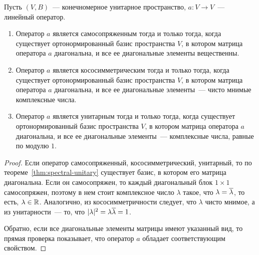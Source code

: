 \begin{theorem}\label{thm:unitary_canonical_forms}
Пусть $(V,B)$~--- конечномерное унитарное пространство,
$a\colon V\to V$~--- линейный оператор.
\begin{enumerate}
\item Оператор $a$ является самосопряженным тогда и
только тогда, когда существует ортонормированный базис пространства
$V$, в котором матрица оператора $a$ диагональна, и все ее
диагональные элементы вещественны.
\item Оператор $a$ является кососимметрическим тогда и
только тогда, когда существует ортонормированный базис пространства
$V$, в котором матрица оператора $a$ диагональна, и все ее
диагональные элементы~--- чисто мнимые комплексные числа.
\item Оператор $a$ является унитарным тогда и
только тогда, когда существует ортонормированный базис пространства
$V$, в котором матрица оператора $a$ диагональна, и все ее
диагональные элементы~--- комплексные числа, равные по модулю $1$.
\end{enumerate}
\end{theorem}
\begin{proof}
Если оператор самосопряженный, кососимметрический, унитарный, то по
теореме~\ref{thm:spectral-unitary} существует базис, в котором его
матрица диагональна. Если он самосопряжен, то каждый диагональный
блок $1\times 1$ самосопряжен, поэтому в нем стоит комплексное число
$\lambda$ такое, что $\lambda=\overline\lambda$, то есть, $\lambda\in\mathbb R$.
Аналогично, из кососимметричности следует, что $\lambda$ чисто мнимое,
а из унитарности~--- то, что $|\lambda|^2 = \lambda\overline\lambda = 1$.

Обратно, если все диагональные элементы матрицы имеют указанный вид,
то прямая проверка показывает, что оператор $a$ обладает
соответствующим свойством.
\end{proof}

